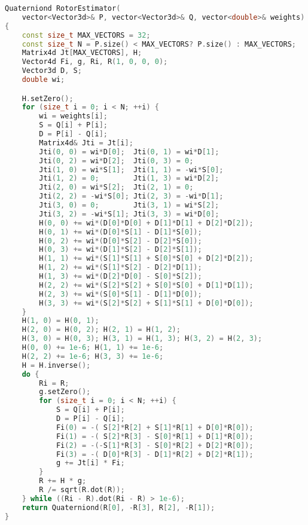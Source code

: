 \documentclass{birkjour}
\numberwithin{equation}{section}
\begin{document}
\begin{lstlisting}[language=C++, caption=C++ code for rotor estimation using Newton method, basicstyle=\tiny, keywordstyle=\bfseries, label=lst:cppcode_e3ga, morekeywords={Matrix4d,Vector4d,Vector3d,Quaterniond,sqrt}]
Quaterniond RotorEstimator(
	vector<Vector3d>& P, vector<Vector3d>& Q, vector<double>& weights)
{
	const size_t MAX_VECTORS = 32;
	const size_t N = P.size() < MAX_VECTORS? P.size() : MAX_VECTORS;
	Matrix4d Jt[MAX_VECTORS], H;
	Vector4d Fi, g, Ri, R(1, 0, 0, 0);
	Vector3d D, S;
	double wi;

	H.setZero();
	for (size_t i = 0; i < N; ++i) {
		wi = weights[i];
		S = Q[i] + P[i];
		D = P[i] - Q[i];
		Matrix4d& Jti = Jt[i];
		Jti(0, 0) = wi*D[0];  Jti(0, 1) = wi*D[1];  
		Jti(0, 2) = wi*D[2];  Jti(0, 3) = 0;
		Jti(1, 0) = wi*S[1];  Jti(1, 1) = -wi*S[0]; 
		Jti(1, 2) = 0;        Jti(1, 3) = wi*D[2];
		Jti(2, 0) = wi*S[2];  Jti(2, 1) = 0;        
		Jti(2, 2) = -wi*S[0]; Jti(2, 3) = -wi*D[1];
		Jti(3, 0) = 0;        Jti(3, 1) = wi*S[2];  
		Jti(3, 2) = -wi*S[1]; Jti(3, 3) = wi*D[0];
		H(0, 0) += wi*(D[0]*D[0] + D[1]*D[1] + D[2]*D[2]);
		H(0, 1) += wi*(D[0]*S[1] - D[1]*S[0]); 
		H(0, 2) += wi*(D[0]*S[2] - D[2]*S[0]); 
		H(0, 3) += wi*(D[1]*S[2] - D[2]*S[1]);
		H(1, 1) += wi*(S[1]*S[1] + S[0]*S[0] + D[2]*D[2]); 
		H(1, 2) += wi*(S[1]*S[2] - D[2]*D[1]); 
		H(1, 3) += wi*(D[2]*D[0] - S[0]*S[2]);
		H(2, 2) += wi*(S[2]*S[2] + S[0]*S[0] + D[1]*D[1]); 
		H(2, 3) += wi*(S[0]*S[1] - D[1]*D[0]);
		H(3, 3) += wi*(S[2]*S[2] + S[1]*S[1] + D[0]*D[0]);
	}
	H(1, 0) = H(0, 1);
	H(2, 0) = H(0, 2); H(2, 1) = H(1, 2);
	H(3, 0) = H(0, 3); H(3, 1) = H(1, 3); H(3, 2) = H(2, 3);
	H(0, 0) += 1e-6; H(1, 1) += 1e-6; 
	H(2, 2) += 1e-6; H(3, 3) += 1e-6;
	H = H.inverse();
	do {
		Ri = R;
		g.setZero();
		for (size_t i = 0; i < N; ++i) {
			S = Q[i] + P[i];
			D = P[i] - Q[i];
			Fi(0) = -( S[2]*R[2] + S[1]*R[1] + D[0]*R[0]);
			Fi(1) = -( S[2]*R[3] - S[0]*R[1] + D[1]*R[0]);
			Fi(2) = -(-S[1]*R[3] - S[0]*R[2] + D[2]*R[0]);
			Fi(3) = -( D[0]*R[3] - D[1]*R[2] + D[2]*R[1]);
			g += Jt[i] * Fi;
		}
		R += H * g;
		R /= sqrt(R.dot(R));
	} while ((Ri - R).dot(Ri - R) > 1e-6);
	return Quaterniond(R[0], -R[3], R[2], -R[1]);
}
\end{lstlisting}





\end{document}
